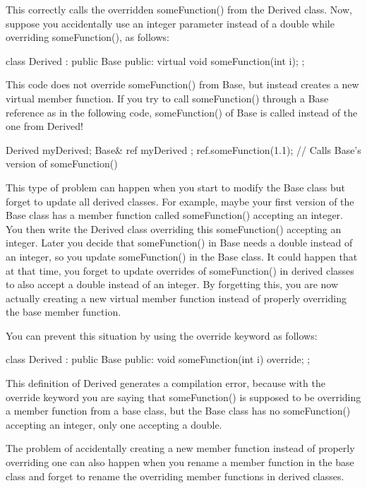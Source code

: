 This correctly calls the overridden someFunction() from the Derived class. Now, suppose you accidentally use an integer parameter instead of a double while overriding someFunction(), as follows:

\begin{cpp}
class Derived : public Base
{
    public:
        virtual void someFunction(int i);
};
\end{cpp}

This code does not override someFunction() from Base, but instead creates a new virtual member function. If you try to call someFunction() through a Base reference as in the following code, someFunction() of Base is called instead of the one from Derived!

\begin{cpp}
Derived myDerived;
Base& ref { myDerived };
ref.someFunction(1.1); // Calls Base's version of someFunction()
\end{cpp}

This type of problem can happen when you start to modify the Base class but forget to update all derived classes. For example, maybe your first version of the Base class has a member function called someFunction() accepting an integer. You then write the Derived class overriding this someFunction() accepting an integer. Later you decide that someFunction() in Base needs a double instead of an integer, so you update someFunction() in the Base class. It could happen that at that time, you forget to update overrides of someFunction() in derived classes to also accept a double instead of an integer. By forgetting this, you are now actually creating a new virtual member function instead of properly overriding the base member function.

You can prevent this situation by using the override keyword as follows:

\begin{cpp}
class Derived : public Base
{
    public:
        void someFunction(int i) override;
};
\end{cpp}

This definition of Derived generates a compilation error, because with the override keyword you are saying that someFunction() is supposed to be overriding a member function from a base class, but the Base class has no someFunction() accepting an integer, only one accepting a double.

The problem of accidentally creating a new member function instead of properly overriding one can also happen when you rename a member function in the base class and forget to rename the overriding member functions in derived classes.

